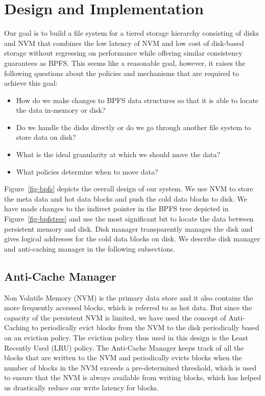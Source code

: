 \section{Design and Implementation}
\label{sec-design}
Our goal is to build a file system for a tiered storage hierarchy consisting of disks and NVM that combines the low latency of NVM and low cost of disk-based storage without regressing on performance while offering similar consistency guarantees as BPFS. This seems like a reasonable goal, however, it raises the following questions about the policies and mechanisms that are required to achieve this goal:

\begin{itemize}
\item How do we make changes to BPFS data structures so that it is able to locate the data in-memory or disk?
\item Do we handle the disks directly or do we go through another file system to store data on disk?
\item What is the ideal granularity at which we should move the data? 
\item What policies determine when to move data?
\end{itemize}

Figure~\ref{fig-bpfs} depicts the overall design of our system. We use NVM to store the meta data and hot data blocks and push the cold data blocks to disk. We have made changes to the indirect pointer in the BPFS tree depicted in Figure~\ref{fig-bpfstree} and use the most significant bit to locate the data between persistent memory and disk. Disk manager transparently manages the disk and gives logical addresses for the cold data blocks on disk. We describe disk manager and anti-caching manager in the following subsections.

\subsection{Anti-Cache Manager}
Non Volatile Memory (NVM) is the primary data store and it also contains the more frequently accessed blocks, which is referred to as hot data. But since the capacity of the persistent NVM is limited, we have used the concept of Anti-Caching to periodically evict blocks from the NVM to the disk periodically based on an eviction policy. The eviction policy thus used in this design is the Least Recently Used (LRU) policy. The Anti-Cache Manager keeps track of all the blocks that are written to the NVM and periodically evicts blocks when the number of blocks in the NVM exceeds a pre-determined threshold, which is used to ensure that the NVM is always available from writing blocks, which has helped us drastically reduce our write latency for blocks.

